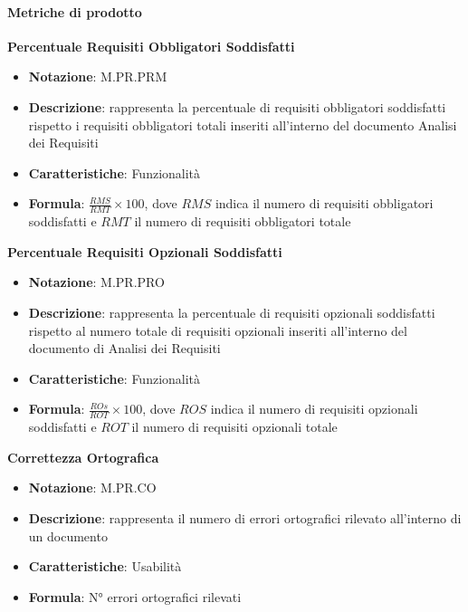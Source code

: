 \paragraph{Metriche di prodotto}
\textbf{Percentuale Requisiti Obbligatori Soddisfatti}
\begin{itemize}
    \item \textbf{Notazione}: M.PR.PRM
    \item \textbf{Descrizione}: rappresenta la percentuale di requisiti obbligatori soddisfatti rispetto i requisiti obbligatori totali inseriti all'interno del documento Analisi dei Requisiti
    \item \textbf{Caratteristiche}: Funzionalità
    \item \textbf{Formula}: $\frac{RMS}{RMT} \times 100$, dove $RMS$ indica il numero di requisiti obbligatori soddisfatti e $RMT$ il numero di requisiti obbligatori totale 
\end{itemize}
\textbf{Percentuale Requisiti Opzionali Soddisfatti}
\begin{itemize}
    \item \textbf{Notazione}: M.PR.PRO
    \item \textbf{Descrizione}: rappresenta la percentuale di requisiti opzionali soddisfatti rispetto al numero totale di requisiti opzionali inseriti all'interno del documento di Analisi dei Requisiti
    \item \textbf{Caratteristiche}: Funzionalità
    \item \textbf{Formula}: $\frac{ROs}{ROT} \times 100$, dove $ROS$ indica il numero di requisiti opzionali soddisfatti e $ROT$ il numero di requisiti opzionali totale 
\end{itemize}
\textbf{Correttezza Ortografica}
\begin{itemize}
    \item \textbf{Notazione}: M.PR.CO
    \item \textbf{Descrizione}: rappresenta il numero di errori ortografici rilevato all'interno di un documento 
    \item \textbf{Caratteristiche}: Usabilità
    \item \textbf{Formula}: N° errori ortografici rilevati
\end{itemize}

   

